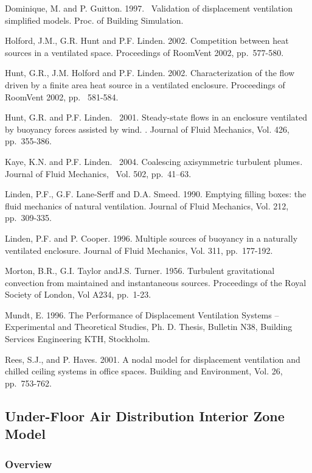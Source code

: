 Dominique, M. and P. Guitton. 1997.~ Validation of displacement ventilation simplified models. Proc. of Building Simulation.

Holford, J.M., G.R. Hunt and P.F. Linden. 2002. Competition between heat sources in a ventilated space. Proceedings of RoomVent 2002, pp.~577-580.

Hunt, G.R., J.M. Holford and P.F. Linden. 2002. Characterization of the flow driven by a finite area heat source in a ventilated enclosure. Proceedings of RoomVent 2002, pp.~ 581-584.

Hunt, G.R. and P.F. Linden.~ 2001. Steady-state flows in an enclosure ventilated by buoyancy forces assisted by wind. . Journal of Fluid Mechanics, Vol. 426,~ pp.~355-386.

Kaye, K.N. and P.F. Linden.~ 2004. Coalescing axisymmetric turbulent plumes\emph{.} Journal of Fluid Mechanics, ~Vol. 502, pp.~41--63.

Linden, P.F., G.F. Lane-Serff and D.A. Smeed. 1990. Emptying filling boxes: the fluid mechanics of natural ventilation. Journal of Fluid Mechanics, Vol. 212, pp.~309-335.

Linden, P.F. and P. Cooper. 1996. Multiple sources of buoyancy in a naturally ventilated enclosure. Journal of Fluid Mechanics, Vol. 311, pp.~177-192.

Morton, B.R., G.I. Taylor andJ.S. Turner. 1956. Turbulent gravitational convection from maintained and instantaneous sources. Proceedings of the Royal Society of London, Vol A234, pp.~1-23.

Mundt, E. 1996. The Performance of Displacement Ventilation Systems -- Experimental and Theoretical Studies, Ph. D. Thesis, Bulletin N38, Building Services Engineering KTH, Stockholm.

Rees, S.J., and P. Haves. 2001. A nodal model for displacement ventilation and chilled ceiling systems in office spaces. Building and Environment, Vol. 26, pp.~753-762.

\subsection{Under-Floor Air Distribution Interior Zone Model}\label{under-floor-air-distribution-interior-zone-model}

\subsubsection{Overview}\label{overview-1-001}

